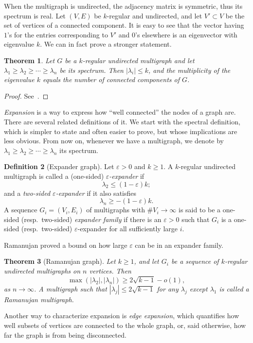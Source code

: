 \documentclass[10pt]{article}
\theoremstyle{plain}
\newtheorem{theorem}{Theorem}
\theoremstyle{definition}
\newtheorem{definition}[theorem]{Definition}
\begin{document}
When the multigraph is undirected, the adjacency matrix is symmetric,
thus its spectrum is real. %
Let $(V,E)$ be $k$-regular and undirected, and let $V'⊂V$ be the set
of vertices of a connected component. %
It is easy to see that the vector having $1$'s for the entries
corresponding to $V'$ and $0$'s elsewhere is an eigenvector with
eigenvalue $k$. %
We can in fact prove a stronger statement.

\begin{theorem}
  Let $G$ be a $k$-regular undirected multigraph and let
  $λ_1 ≥ λ_2 ≥ \cdots ≥ λ_n$ be its spectrum. %
  Then $|λ_i| ≤ k$, and the multiplicity of the eigenvalue $k$ equals
  the number of connected components of $G$.
\end{theorem}
\begin{proof}
  See~\cite[Chap.~3]{trevisan-graphs}.
\end{proof}

\emph{Expansion} is a way to express how ``well connected'' the nodes
of a graph are. %
There are several related definitions of it. %
We start with the spectral definition, which is simpler to state and
often easier to prove, but whose implications are less obvious. %
From now on, whenever we have a multigraph, we denote by
$λ_1 ≥ λ_2 ≥ \cdots ≥ λ_n$ its spectrum.

\begin{definition}[Expander graph]
  Let $ε>0$ and $k≥1$. %
  A $k$-regular undirected multigraph is called a (one-sided)
  \emph{$ε$-expander} if
  \[λ_2≤(1-ε)k;\]
  and a \emph{two-sided $ε$-expander} if it also satisfies
  \[λ_n≥-(1-ε)k.\] %
  A sequence $G_i=(V_i,E_i)$ of multigraphs with $\#V_i→∞$ is said to
  be a one-sided (resp.\ two-sided) \emph{expander family} if there is
  an $ε>0$ such that $G_i$ is a one-sided (resp.\ two-sided)
  $ε$-expander for all sufficiently large $i$.
\end{definition}

Ramanujan proved a bound on how large $ε$ can be in an expander
family. %

\begin{theorem}[Ramanujan graph]
  Let $k≥1$, and let $G_i$ be a sequence of $k$-regular undirected
  multigraphs on $n$ vertices. %
  Then
  \[\max(|λ_2|,|λ_n|) ≥ 2\sqrt{k-1} - o(1),\]
  as $n→∞$. %
  A multigraph such that $|λ_j|≤2\sqrt{k-1}$ for any $λ_j$ except
  $λ_1$ is called a \emph{Ramanujan multigraph}.
\end{theorem}

Another way to characterize expansion is \emph{edge expansion}, which
quantifies how well subsets of vertices are connected to the whole
graph, or, said otherwise, how far the graph is from being
disconnected.
\end{document}

